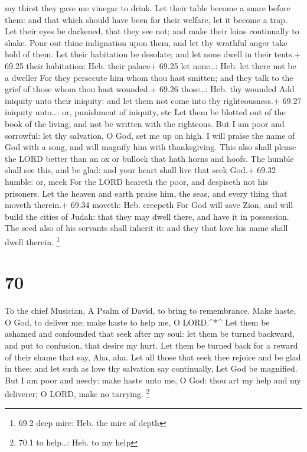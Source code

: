 my thirst they gave me vinegar to drink.  Let their table
become a snare before them: and that which should have been for their
welfare, let it become a trap.  Let their eyes be darkened,
that they see not; and make their loins continually to shake.
 Pour out thine indignation upon them, and let thy wrathful
anger take hold of them.  Let their habitation be desolate;
and let none dwell in their tents.+ 69.25 their habitation: Heb. their
palace+ 69.25 let none\ldots: Heb. let there not be a dweller
 For they persecute him whom thou hast smitten; and they
talk to the grief of those whom thou hast wounded.+ 69.26 those\ldots:
Heb. thy wounded  Add iniquity unto their iniquity: and let
them not come into thy righteousness.+ 69.27 iniquity unto\ldots: or,
punishment of iniquity, etc  Let them be blotted out of the
book of the living, and not be written with the righteous. 
But I am poor and sorrowful: let thy salvation, O God, set me up on
high.  I will praise the name of God with a song, and will
magnify him with thanksgiving.  This also shall please the
LORD better than an ox or bullock that hath horns and hoofs.
 The humble shall see this, and be glad: and your heart
shall live that seek God.+ 69.32 humble: or, meek  For the
LORD heareth the poor, and despiseth not his prisoners. 
Let the heaven and earth praise him, the seas, and every thing that
moveth therein.+ 69.34 moveth: Heb. creepeth  For God will
save Zion, and will build the cities of Judah: that they may dwell
there, and have it in possession.  The seed also of his
servants shall inherit it: and they that love his name shall dwell
therein. \footnote{69.2 deep mire: Heb. the mire of depth}

\hypertarget{section-69}{%
\section{70}\label{section-69}}

To the chief Musician, A Psalm of David, to bring to remembrance.
 Make haste, O God, to deliver me; make haste to help me, O
LORD.\^{}*\^{}  Let them be ashamed and confounded that seek
after my soul: let them be turned backward, and put to confusion, that
desire my hurt.  Let them be turned back for a reward of
their shame that say, Aha, aha.  Let all those that seek
thee rejoice and be glad in thee: and let such as love thy salvation say
continually, Let God be magnified.  But I am poor and needy:
make haste unto me, O God: thou art my help and my deliverer; O LORD,
make no tarrying. \footnote{70.1 to help\ldots: Heb. to my help}

